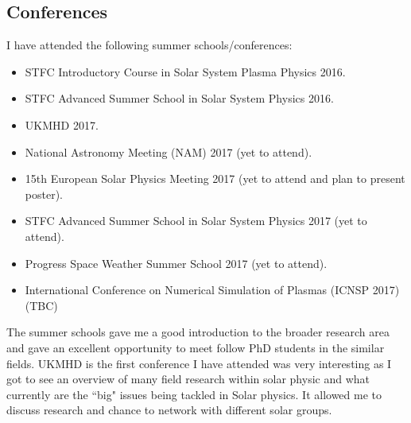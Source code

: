 \documentclass[12pt,a4paper,twoside]{article}
\begin{document}
\subsection{Conferences} 
I have attended the following summer schools/conferences:
\begin{itemize}
\item STFC Introductory Course in Solar System Plasma Physics 2016. 
\item STFC Advanced Summer School in Solar System Physics 2016. 
\item UKMHD 2017.
\item National Astronomy Meeting (NAM) 2017 (yet to attend).
\item 15th European Solar Physics Meeting 2017 (yet to attend and plan to present poster). 
\item STFC Advanced Summer School in Solar System Physics 2017 (yet to attend).
\item Progress Space Weather Summer School 2017 (yet to attend).
\item International Conference on Numerical Simulation of Plasmas (ICNSP 2017) (TBC) 
\end{itemize}
The summer schools gave me a good introduction to the broader research area and gave an excellent opportunity to meet follow PhD students in the similar fields. UKMHD is the first conference I have attended was very interesting as I got to see an overview of many field research within solar physic and what currently are the ``big" issues being tackled in Solar physics. It allowed me to discuss research and chance to network with different solar groups. 
\end{document}
